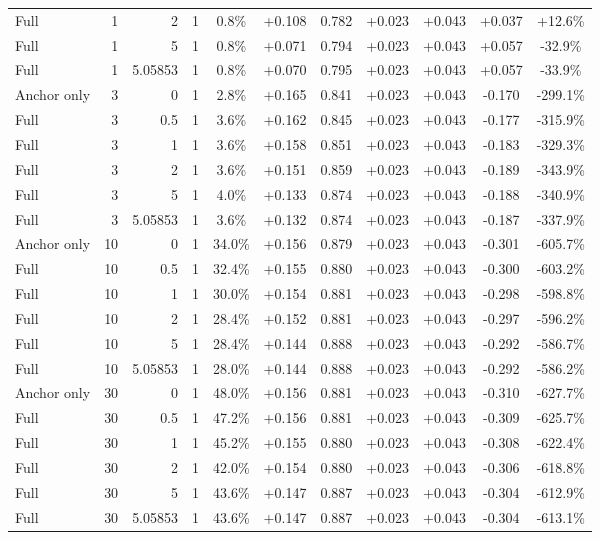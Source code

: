 \begin{table}[htbp]
\begin{tabular}{lrrrccccccc}
Full & 1 & 2 & 1 & 0.8\% & +0.108 & 0.782 & +0.023 & +0.043 & +0.037 & +12.6\% \\
Full & 1 & 5 & 1 & 0.8\% & +0.071 & 0.794 & +0.023 & +0.043 & +0.057 & -32.9\% \\
Full & 1 & 5.05853 & 1 & 0.8\% & +0.070 & 0.795 & +0.023 & +0.043 & +0.057 & -33.9\% \\
Anchor only & 3 & 0 & 1 & 2.8\% & +0.165 & 0.841 & +0.023 & +0.043 & -0.170 & -299.1\% \\
Full & 3 & 0.5 & 1 & 3.6\% & +0.162 & 0.845 & +0.023 & +0.043 & -0.177 & -315.9\% \\
Full & 3 & 1 & 1 & 3.6\% & +0.158 & 0.851 & +0.023 & +0.043 & -0.183 & -329.3\% \\
Full & 3 & 2 & 1 & 3.6\% & +0.151 & 0.859 & +0.023 & +0.043 & -0.189 & -343.9\% \\
Full & 3 & 5 & 1 & 4.0\% & +0.133 & 0.874 & +0.023 & +0.043 & -0.188 & -340.9\% \\
Full & 3 & 5.05853 & 1 & 3.6\% & +0.132 & 0.874 & +0.023 & +0.043 & -0.187 & -337.9\% \\
Anchor only & 10 & 0 & 1 & 34.0\% & +0.156 & 0.879 & +0.023 & +0.043 & -0.301 & -605.7\% \\
Full & 10 & 0.5 & 1 & 32.4\% & +0.155 & 0.880 & +0.023 & +0.043 & -0.300 & -603.2\% \\
Full & 10 & 1 & 1 & 30.0\% & +0.154 & 0.881 & +0.023 & +0.043 & -0.298 & -598.8\% \\
Full & 10 & 2 & 1 & 28.4\% & +0.152 & 0.881 & +0.023 & +0.043 & -0.297 & -596.2\% \\
Full & 10 & 5 & 1 & 28.4\% & +0.144 & 0.888 & +0.023 & +0.043 & -0.292 & -586.7\% \\
Full & 10 & 5.05853 & 1 & 28.0\% & +0.144 & 0.888 & +0.023 & +0.043 & -0.292 & -586.2\% \\
Anchor only & 30 & 0 & 1 & 48.0\% & +0.156 & 0.881 & +0.023 & +0.043 & -0.310 & -627.7\% \\
Full & 30 & 0.5 & 1 & 47.2\% & +0.156 & 0.881 & +0.023 & +0.043 & -0.309 & -625.7\% \\
Full & 30 & 1 & 1 & 45.2\% & +0.155 & 0.880 & +0.023 & +0.043 & -0.308 & -622.4\% \\
Full & 30 & 2 & 1 & 42.0\% & +0.154 & 0.880 & +0.023 & +0.043 & -0.306 & -618.8\% \\
Full & 30 & 5 & 1 & 43.6\% & +0.147 & 0.887 & +0.023 & +0.043 & -0.304 & -612.9\% \\
Full & 30 & 5.05853 & 1 & 43.6\% & +0.147 & 0.887 & +0.023 & +0.043 & -0.304 & -613.1\% \\

\end{tabular}
\end{table}
